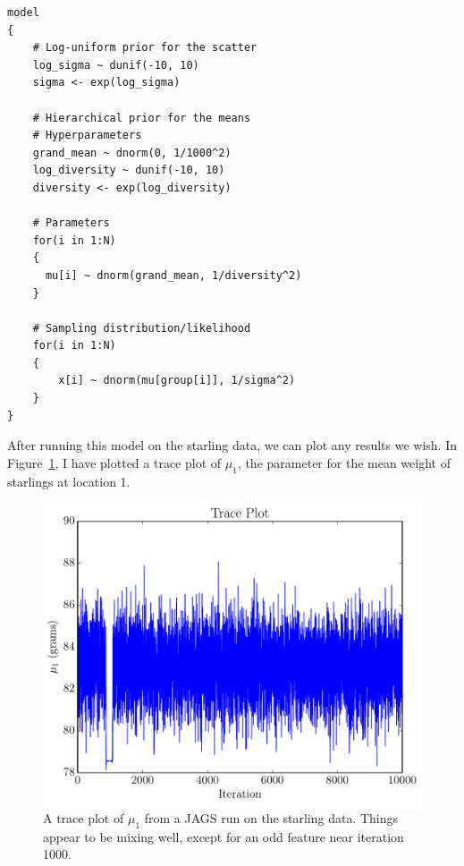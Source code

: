 \begin{verbatim}
model
{
    # Log-uniform prior for the scatter
    log_sigma ~ dunif(-10, 10)
    sigma <- exp(log_sigma)

    # Hierarchical prior for the means
    # Hyperparameters
    grand_mean ~ dnorm(0, 1/1000^2)
    log_diversity ~ dunif(-10, 10)
    diversity <- exp(log_diversity)

    # Parameters
    for(i in 1:N)
    {
      mu[i] ~ dnorm(grand_mean, 1/diversity^2)
    }

    # Sampling distribution/likelihood
    for(i in 1:N)
    {
        x[i] ~ dnorm(mu[group[i]], 1/sigma^2)
    }
}
\end{verbatim}

After running this model on the starling data, we can plot any results we
wish. In Figure~\ref{fig:trace_starlings2}, I have plotted a trace plot of
$\mu_1$, the parameter for the mean weight of starlings at location 1.

\begin{figure}[ht!]
\begin{center}
\includegraphics[scale=0.6]{Figures/trace_starlings.pdf}
\caption{A trace plot of $\mu_1$ from a JAGS run on the starling data. Things
appear to be mixing well, except for an odd feature near iteration 1000.
\label{fig:trace_starlings2}}
\end{center}
\end{figure}

